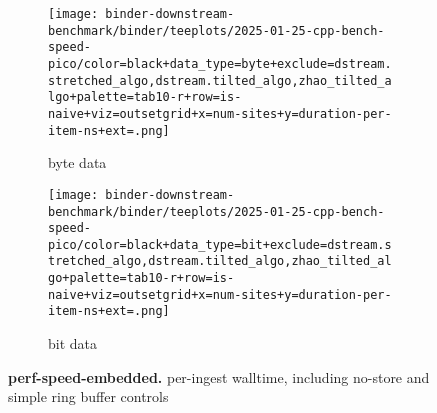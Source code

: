 \begin{figure*}

\begin{subfigure}{0.28\textwidth}
\centering
\texttt{[image: binder-downstream-benchmark/binder/teeplots/2025-01-25-cpp-bench-speed-pico/color=black+data\_type=byte+exclude=dstream.stretched\_algo,dstream.tilted\_algo,zhao\_tilted\_algo+palette=tab10-r+row=is-naive+viz=outsetgrid+x=num-sites+y=duration-per-item-ns+ext=.png]}
\caption{byte data}
\label{fig:perf-speed-embedded:byte}
\end{subfigure}%
\begin{subfigure}{0.72\textwidth}
\texttt{[image: binder-downstream-benchmark/binder/teeplots/2025-01-25-cpp-bench-speed-pico/color=black+data\_type=bit+exclude=dstream.stretched\_algo,dstream.tilted\_algo,zhao\_tilted\_algo+palette=tab10-r+row=is-naive+viz=outsetgrid+x=num-sites+y=duration-per-item-ns+ext=.png]}
\centering
\caption{bit data}
\label{fig:perf-speed-embedded:bit}
\end{subfigure}

\caption{
\textbf{perf-speed-embedded.}
\footnotesize
per-ingest walltime, including no-store and simple ring buffer controls
}
\label{fig:perf-speed-embedded}
\end{figure*}
